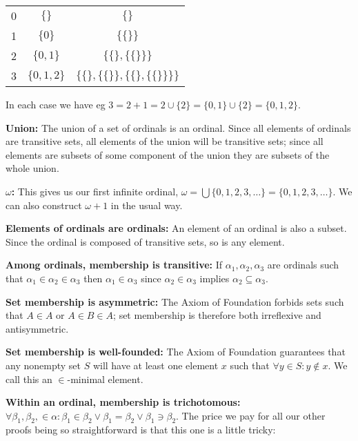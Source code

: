\documentclass{article}
\begin{document}
\begin{tabular}{ c c c }
0 & $\{\}$ & $\{\}$ \\
1 & $\{0\}$ & $\{\{\}\}$ \\
2 & $\{0, 1\}$ & $\{\{\}, \{\{\}\}\}$ \\
3 & $\{0, 1, 2\}$ & $\{\{\}, \{\{\}\}, \{\{\}, \{\{\}\}\}\}$ \\
\end{tabular}

In each case we have eg $3 = 2 + 1 = 2 \cup \{2\} = \{0, 1\} \cup \{2\} = \{0, 1, 2\}$.

\textbf{Union:} The union of a set of ordinals is an ordinal. Since all elements of ordinals are transitive sets, all elements of the union will be transitive sets; since all elements are subsets of some component of the union they are subsets of the whole union.

\textbf{$\omega$:} This gives us our first infinite ordinal, $\omega = \bigcup\{0, 1, 2, 3, \ldots\} =  \{0, 1, 2, 3, \ldots\}$. We can also construct $\omega + 1$ in the usual way.

\textbf{Elements of ordinals are ordinals:} An element of an ordinal is also a subset. Since the ordinal is composed of transitive sets, so is any element.

\textbf{Among ordinals, membership is transitive:} If $\alpha_1, \alpha_2, \alpha_3$ are ordinals such that $\alpha_1 \in \alpha_2 \in \alpha_3$ then $\alpha_1 \in \alpha_3$ since $\alpha_2 \in \alpha_3$ implies $\alpha_2 \subseteq \alpha_3$.

\textbf{Set membership is asymmetric:} The Axiom of Foundation forbids sets such that $A \in A$ or $A \in B \in A$; set membership is therefore both irreflexive and antisymmetric.

\textbf{Set membership is well-founded:} The Axiom of Foundation guarantees that any nonempty set $S$ will have at least one element $x$ such that $\forall y \in S: y \not\in x$. We call this an $\in$-minimal element.

\textbf{Within an ordinal, membership is trichotomous:} $\forall \beta_1, \beta_2, \in \alpha: \beta_1 \in \beta_2 \vee \beta_1 = \beta_2 \vee \beta_1 \ni \beta_2$. The price we pay for all our other proofs being so straightforward is that this one is a little tricky: \cite{1057102}
\end{document}
